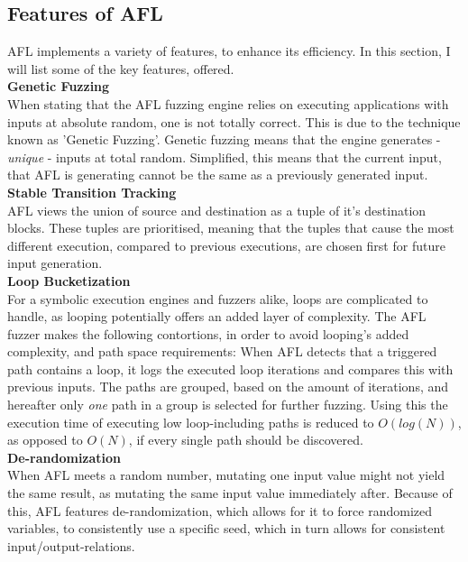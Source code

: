\documentclass[a4paper]{article}
\newcommand{\tbf}[1]{\textbf{#1}}
\newcommand{\tit}[1]{\textit{#1}}
\newcommand{\subsubsubsection}[1]{\tbf{#1}\\}
\begin{document}
\subsection{Features of AFL}
\label{sec:FeaturesAFL}
AFL implements a variety of features, to enhance its efficiency. In this section, I will list some of the key features, offered.\\
\subsubsubsection{Genetic Fuzzing}
When stating that the AFL fuzzing engine relies on executing applications with inputs at absolute random, one is not totally correct. This is due to the technique known as 'Genetic Fuzzing'. Genetic fuzzing means that the engine generates - \tit{unique} - inputs at total random. Simplified, this means that the current input, that AFL is generating cannot be the same as a previously generated input.\\
\subsubsubsection{Stable Transition Tracking}
AFL views the union of source and destination as a tuple of it's destination blocks. These tuples are prioritised, meaning that the tuples that cause the most different execution, compared to previous executions, are chosen first for future input generation.\\
\subsubsubsection{Loop Bucketization}
For a symbolic execution engines and fuzzers alike, loops are complicated to handle, as looping potentially offers an added layer of complexity. The AFL fuzzer makes the following contortions, in order to avoid looping's added complexity, and path space requirements:
When AFL detects that a triggered path contains a loop, it logs the executed loop iterations and compares this with previous inputs. The paths are grouped, based on the amount of iterations, and hereafter only \tit{one} path in a group is selected for further fuzzing. Using this the execution time of executing low loop-including paths is reduced to $O(log(N))$, as opposed to $O(N)$, if every single path should be discovered.\\
\subsubsubsection{De-randomization}
When AFL meets a random number, mutating one input value might not yield the same result, as mutating the same input value immediately after. Because of this, AFL features de-randomization, which allows for it to force randomized variables, to consistently use a specific seed, which in turn allows for consistent input/output-relations.
\newpage
\end{document}
